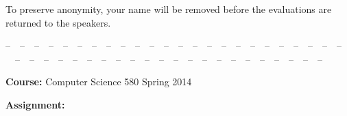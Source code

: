 \documentclass[letterpaper, 10pt]{article} %
\begin{document}
\pagestyle{empty}

\vspace*{-1.2in}

\small
{}\underline{\hspace{3in}}

\vspace{.25in}
\noindent To preserve anonymity, your name will be removed before 
the evaluations are returned to the speakers.

\medskip
\noindent--\ \ --\ \ --\ \ --\ \ --\ \ --\ \ --\ \ --\ \ --\ \ --\ \ --\ \ --\ \ --\ \ --\ \ --\ \ --\ \ --\ \ --\ \ --\ \ --\ \ --\ \ --\ \ --\ \ --\ \ --\ \ --\ \ --\ \ --\ \ --\ \ --\ \ --\ \ --\ \ --\ \ --\ \ --\ \ --\ \ --\ \ --\ \ --\ \ --\ \ --\ \ --\ \ --\ \ --\ \ --\ \ --\ \ 

\medskip

\underline{\hspace{1.5in}} \hfill {} 

\vspace*{.1in}

\noindent
{\bf Course:} Computer Science 580 Spring 2014

\vspace*{.1in}

\noindent
{\bf Assignment:} 

\vspace*{.1in}
\end{document}

